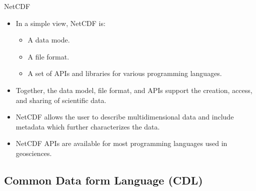 \documentclass[compress,11pt,xcolor=svgnames,aspectratio=169]{beamer}
\begin{document}
\begin{frame}[fragile] {NetCDF}

\begin{itemize}
\setlength\itemsep{0.4cm}

\item In a simple view, NetCDF is:

    \begin{itemize}
        \item A data mode.
        \item A file format.
        \item A set of APIs and libraries for various programming languages.
    \end{itemize}

\item Together, the data model, file format, and APIs support the creation, access, and sharing of scientific data.

\item NetCDF allows the user to describe multidimensional data and include metadata which further characterizes the data.

\item NetCDF APIs are available for most programming languages used in geosciences.

\end{itemize}

\nocite{netcdf}

\end{frame}

\subsection{Common Data form Language (CDL)}
\end{document}

